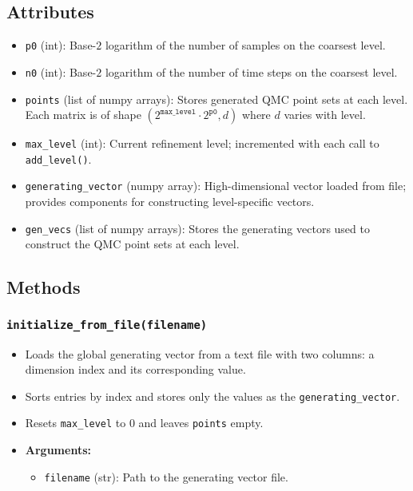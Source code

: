 \documentclass{article}
\begin{document}
\subsection{Attributes}
\begin{itemize}
    \item \texttt{p0} (int): Base-$2$ logarithm of the number of samples on the coarsest level.
    \item \texttt{n0} (int): Base-$2$ logarithm of the number of time steps on the coarsest level.
    \item \texttt{points} (list of numpy arrays): Stores generated QMC point sets at each level. Each matrix is of shape $(2^{\texttt{max\_level}} \cdot 2^{\texttt{p0}}, d)$ where $d$ varies with level.
    \item \texttt{max\_level} (int): Current refinement level; incremented with each call to \texttt{add\_level()}.
    \item \texttt{generating\_vector} (numpy array): High-dimensional vector loaded from file; provides components for constructing level-specific vectors.
    \item \texttt{gen\_vecs} (list of numpy arrays): Stores the generating vectors used to construct the QMC point sets at each level.
\end{itemize}

\subsection{Methods}

\subsubsection{\texttt{initialize\_from\_file(filename)}}
\begin{itemize}
    \item Loads the global generating vector from a text file with two columns: a dimension index and its corresponding value.
    \item Sorts entries by index and stores only the values as the \texttt{generating\_vector}.
    \item Resets \texttt{max\_level} to 0 and leaves \texttt{points} empty.
    \item \textbf{Arguments:}
    \begin{itemize}
        \item \texttt{filename} (str): Path to the generating vector file.
    \end{itemize}
\end{itemize}
\end{document}
